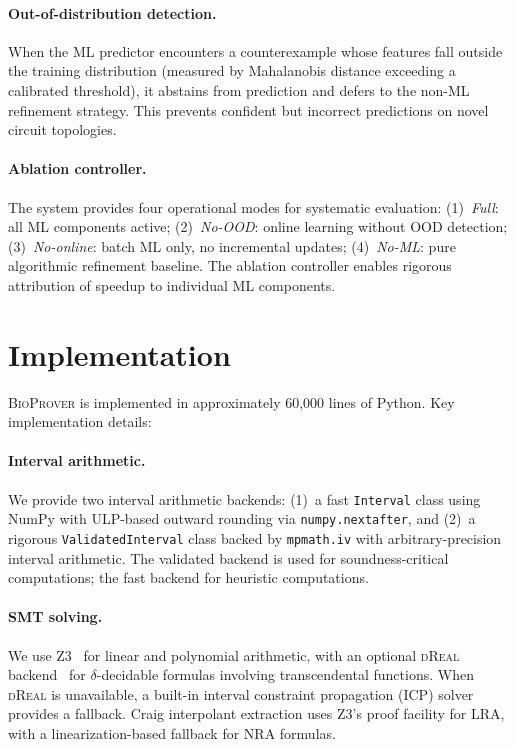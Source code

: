 \documentclass[11pt]{article}
\newcommand{\bioprover}{\textsc{BioProver}}
\newcommand{\dreal}{\textsc{dReal}}
\begin{document}
\paragraph{Out-of-distribution detection.}
When the ML predictor encounters a counterexample whose features
fall outside the training distribution (measured by Mahalanobis
distance exceeding a calibrated threshold), it abstains from
prediction and defers to the non-ML refinement strategy. This
prevents confident but incorrect predictions on novel circuit
topologies.

\paragraph{Ablation controller.}
The system provides four operational modes for systematic evaluation:
(1)~\emph{Full}: all ML components active;
(2)~\emph{No-OOD}: online learning without OOD detection;
(3)~\emph{No-online}: batch ML only, no incremental updates;
(4)~\emph{No-ML}: pure algorithmic refinement baseline.
The ablation controller enables rigorous attribution of speedup to
individual ML components.

\section{Implementation}
\label{sec:implementation}

\bioprover{} is implemented in approximately 60,000 lines of Python.
Key implementation details:

\paragraph{Interval arithmetic.}
We provide two interval arithmetic backends: (1)~a fast
\texttt{Interval} class using NumPy with ULP-based outward rounding
via \texttt{numpy.nextafter}, and (2)~a rigorous
\texttt{ValidatedInterval} class backed by \texttt{mpmath.iv} with
arbitrary-precision interval arithmetic. The validated backend is used
for soundness-critical computations; the fast backend for heuristic
computations.

\paragraph{SMT solving.}
We use Z3~\cite{demoura2008z3} for linear and polynomial arithmetic,
with an optional \dreal{} backend~\cite{gao2013dreal} for
$\delta$-decidable formulas involving transcendental functions. When
\dreal{} is unavailable, a built-in interval constraint propagation
(ICP) solver provides a fallback. Craig interpolant extraction uses
Z3's proof facility for LRA, with a linearization-based fallback for
NRA formulas.
\end{document}
